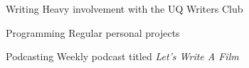 


\begin{cvskills}


\cvskill
{Writing} %
{Heavy involvement with the UQ Writers Club} %


\cvskill
{Programming} %
{Regular personal projects} %


\cvskill
{Podcasting} %
{Weekly podcast titled \textit{Let's Write A Film}} %


\end{cvskills}